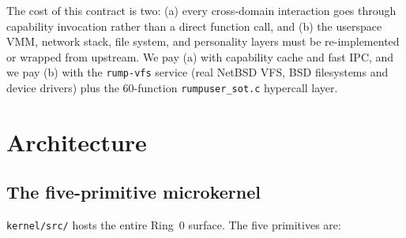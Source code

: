 \documentclass[11pt,a4paper]{article}
\begin{document}
The cost of this contract is two: (a) every cross-domain interaction
goes through capability invocation rather than a direct function call,
and (b) the userspace VMM, network stack, file system, and personality
layers must be re-implemented or wrapped from upstream. We pay (a)
with capability cache and fast IPC, and we pay (b) with the
\texttt{rump-vfs} service (real NetBSD VFS, BSD filesystems and
device drivers) plus the 60-function \texttt{rumpuser\_sot.c}
hypercall layer.

\section{Architecture}

\subsection{The five-primitive microkernel}

\texttt{kernel/src/} hosts the entire Ring~0 surface. The five
primitives are:
\end{document}
